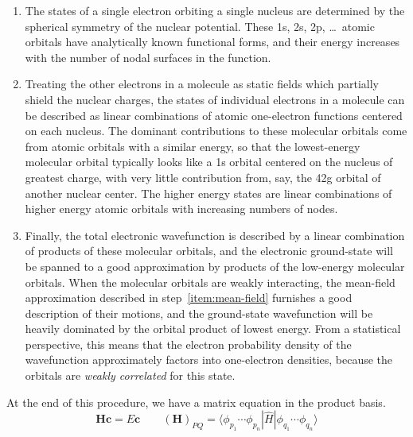 \begin{enumerate}
    \item
        \label{item:atomic-orbitals}
        The states of a single electron orbiting a single nucleus are determined
        by the spherical symmetry of the nuclear potential.
        These 1s, 2s, 2p, \dots\ atomic orbitals have analytically known
        functional forms, and their energy increases with the number of nodal
        surfaces in the function.
    \item
        \label{item:mean-field}
        Treating the other electrons in a molecule as static fields which
        partially shield the nuclear charges, the states of individual electrons
        in a molecule can be described as linear combinations of atomic
        one-electron functions centered on each nucleus.
        The dominant contributions to these molecular orbitals come from atomic
        orbitals with a similar energy, so that the lowest-energy molecular
        orbital typically looks like a 1s orbital centered on the nucleus of
        greatest charge, with very little contribution from, say, the 42g
        orbital of another nuclear center.
        The higher energy states are linear combinations of higher energy atomic
        orbitals with increasing numbers of nodes.
    \item
        \label{item:full-ci}
        Finally, the total electronic wavefunction is described by a linear
        combination of products of these molecular orbitals, and the electronic
        ground-state will be spanned to a good approximation by products of the
        low-energy molecular orbitals.
        When the molecular orbitals are weakly interacting, the mean-field
        approximation described in step~\ref{item:mean-field} furnishes a good
        description of their motions, and the ground-state wavefunction will be
        heavily dominated by the orbital product of lowest energy.
        From a statistical perspective, this means that the electron probability
        density of the wavefunction approximately factors into one-electron
        densities, because the orbitals are {\itshape weakly correlated} for
        this state.
\end{enumerate}
At the end of this procedure, we have a matrix equation in the product basis.
\begin{equation}
    \mathbf{H}\mathbf{c}
    =
    E\mathbf{c}
    \qquad
    (\mathbf{H})_{PQ}
    =
    \langle \phi_{p_1}\cdots \phi_{p_n}|
    \hat{H}
    |\phi_{q_1}\cdots \phi_{q_n} \rangle
\end{equation}
